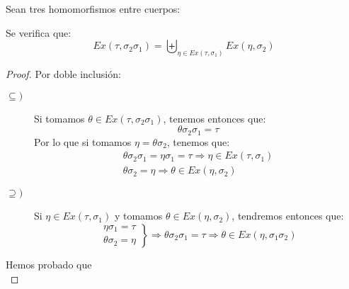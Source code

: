 \begin{lema}
    Sean tres homomorfismos entre cuerpos:
    \begin{figure}[H]
        \centering
    \end{figure}
    Se verifica que:
    \begin{equation*}
        Ex(\tau,\sigma_2\sigma_1) = \biguplus_{\eta \in Ex(\tau,\sigma_1)} Ex(\eta,\sigma_2)
    \end{equation*}
    \begin{proof}
        Por doble inclusión:
        \begin{description}
            \item [$\subseteq )$] Si tomamos $\theta \in Ex(\tau,\sigma_2\sigma_1)$, tenemos entonces que:
                \begin{equation*}
                    \theta\sigma_2\sigma_1 = \tau
                \end{equation*}
                Por lo que si tomamos $\eta = \theta\sigma_2$, tenemos que:
                \begin{gather*}
                    \theta\sigma_2\sigma_1 = \eta\sigma_1 = \tau \Longrightarrow \eta \in Ex(\tau,\sigma_1) \\
                    \theta\sigma_2 = \eta \Longrightarrow \theta \in Ex(\eta, \sigma_2)
                \end{gather*}
            \item [$\supseteq )$] Si $\eta \in Ex(\tau,\sigma_1)$ y tomamos $\theta\in Ex(\eta,\sigma_2)$, tendremos entonces que:
                \begin{equation*}
                    \left.\begin{array}{l}
                        \eta\sigma_1 = \tau \\
                        \theta\sigma_2 = \eta
                    \end{array}\right\}\Longrightarrow \theta\sigma_2\sigma_1 = \tau \Longrightarrow \theta\in Ex(\eta,\sigma_1\sigma_2)
                \end{equation*}
        \end{description}
        Hemos probado que
        \begin{equation*}

\end{equation*}
\end{proof}
\end{lema}
